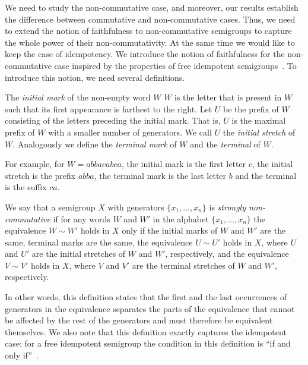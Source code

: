 \documentclass{toc}
\begin{document}
We need to study the non-commutative case, and moreover, our results
establish the difference between commutative and non-commutative cases. Thus,
we need to extend the notion of faithfulness to non-commutative semigroups to
capture %
the whole power of their non-commutativity.  %
At the same time we would
like to keep the case of idempotency. We introduce the notion of faithfulness
for the non-commutative case inspired by the properties of free idempotent
semigroups~\cite{GreenR52}. To introduce this notion, we need several
definitions.


\begin{definition}
The \emph{initial mark} of
the non-empty word $W$  %
$W$ is the letter that is present in $W$ such that
its first appearance is farthest to the right. Let $U$ be the prefix of $W$
consisting of
the  %
letters preceding the initial mark. That is, $U$ is the maximal
prefix of $W$ with a smaller number of generators. We call $U$ the
%
%
%
%
\emph{initial stretch} %
of $W$. Analogously we define the \emph{terminal mark} of $W$ and
the \emph{terminal} of $W$.
\end{definition}

For example, for $W = abbacabca$, the initial mark is the first letter $c$, the
%
%
initial stretch %
is
the prefix $abba$, the terminal mark is the last letter $b$ and the terminal is the suffix $ca$.

\begin{definition}\label{def:strong_non_commutativity}
We say that a semigroup $X$ with generators $\{x_1,\ldots, x_n\}$ is
\emph{strongly non-commutative} if for any words $W$ and $W'$ in the
alphabet $\{x_1,\ldots, x_n\}$ the equivalence $W\sim W'$ holds in $X$ only if
the initial marks of $W$ and $W'$ are the same, terminal marks are the same,
the equivalence $U \sim U'$ holds in $X$, where $U$ and $U'$ are the
%
%
initial stretches %
of
$W$ and $W'$, respectively, and the equivalence $V \sim V'$ holds in $X$, where
$V$ and $V'$ are the %
terminal stretches  %
of $W$ and $W'$, respectively.
\end{definition}

In other words, this definition states that the first and the last occurrences
of generators in the equivalence separates the parts of the equivalence that
cannot be affected by the rest of the generators and must therefore be
equivalent themselves. We also note that this definition exactly captures the
idempotent case: for a free idempotent semigroup the condition in this
definition is ``if and only if''~\cite{GreenR52}.
\end{document}
